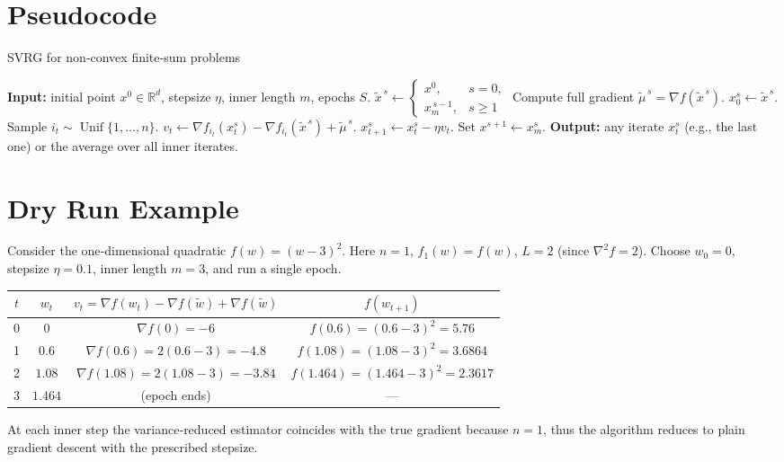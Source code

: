\documentclass[11pt]{article}
\newcommand{\R}{\mathbb{R}}
\begin{document}
\section*{Pseudocode}
\begin{algorithm}[H]
\caption{SVRG for non‑convex finite‑sum problems}
\begin{algorithmic}[1]
\STATE \textbf{Input:} initial point $x^{0}\in\R^{d}$, stepsize $\eta$, inner length $m$, epochs $S$.
    \STATE $\tilde{x}^{\,s}\gets 
    \begin{cases}
        x^{0}, & s=0,\\
        x_{m}^{\,s-1}, & s\ge 1
    \end{cases}$
    \STATE Compute full gradient $\tilde{\mu}^{\,s}= \nabla f(\tilde{x}^{\,s})$.
    \STATE $x^{s}_{0}\gets \tilde{x}^{\,s}$.
        \STATE Sample $i_t\sim\operatorname{Unif}\{1,\dots,n\}$.
        \STATE $v_t \gets \nabla f_{i_t}(x^{s}_{t})-\nabla f_{i_t}(\tilde{x}^{\,s})+\tilde{\mu}^{\,s}$.
        \STATE $x^{s}_{t+1}\gets x^{s}_{t}-\eta v_t$.
    \ENDFOR
    \STATE Set $x^{s+1}\gets x^{s}_{m}$.
\ENDFOR
\STATE \textbf{Output:} any iterate $x^{s}_{t}$ (e.g., the last one) or the average over all inner iterates.
\end{algorithmic}
\end{algorithm}

\section*{Dry Run Example}
Consider the one‑dimensional quadratic $f(w)=(w-3)^2$.
Here $n=1$, $f_1(w)=f(w)$, $L=2$ (since $\nabla^2 f=2$).  
Choose $w_0=0$, stepsize $\eta=0.1$, inner length $m=3$, and run a single epoch.

\begin{center}
\begin{tabular}{c|c|c|c}
$t$ & $w_t$ & $v_t=\nabla f(w_t)-\nabla f(\tilde w)+\nabla f(\tilde w)$ & $f(w_{t+1})$\\ \hline
0 & $0$ & $\nabla f(0)= -6$ & $f(0.6)= (0.6-3)^2=5.76$\\
1 & $0.6$ & $\nabla f(0.6)=2(0.6-3)=-4.8$ & $f(1.08)= (1.08-3)^2=3.6864$\\
2 & $1.08$ & $\nabla f(1.08)=2(1.08-3)=-3.84$ & $f(1.464)= (1.464-3)^2=2.3617$\\
3 & $1.464$ & (epoch ends) & ---
\end{tabular}
\end{center}
At each inner step the variance‑reduced estimator coincides with the true gradient because $n=1$, thus the algorithm reduces to plain gradient descent with the prescribed stepsize.
\end{document}
